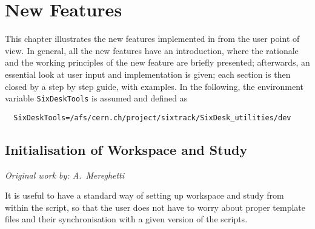 \chapter{New Features} \label{NewFeatures}
This chapter illustrates the new features implemented in \SIXDESK{} from
the user point of view. In general, all the new features have an introduction,
where the rationale and the working principles of the new feature are briefly
presented; afterwards, an essential look at user input and implementation
is given; each section is then closed by a step by step guide, with
examples. In the following, the environment variable
\texttt{SixDeskTools} is assumed and defined as
\begin{lstlisting}
  SixDeskTools=/afs/cern.ch/project/sixtrack/SixDesk_utilities/dev
\end{lstlisting}

\section{Initialisation of Workspace and Study} \label{Initialisation}
\begin{flushright}
\emph{Original work by: A.~Mereghetti}
\end{flushright}
It is useful to have a standard way of setting up workspace and study
from within the \SIXDESK{} script, so that the user does not have to
worry about proper template files and their synchronisation with a given
version of the scripts.

